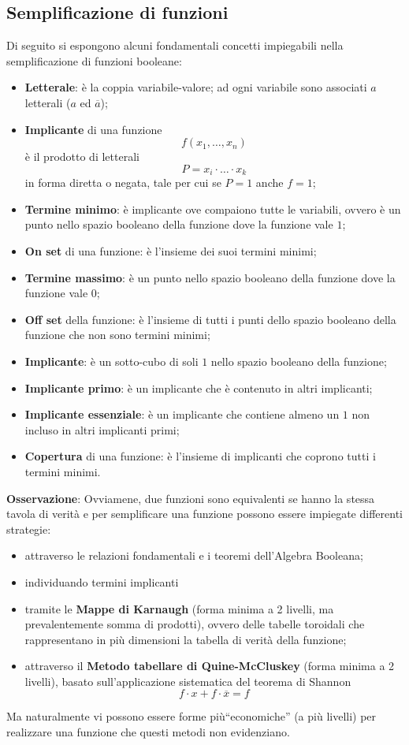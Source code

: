 \documentclass[a4paper]{extarticle}
\newcommand{\quotes}[1]{``#1''}
\begin{document}
\subsection{Semplificazione di funzioni}
Di seguito si espongono alcuni fondamentali concetti impiegabili nella semplificazione di funzioni booleane:
\begin{itemize}
    \item \textbf{Letterale}: è la coppia variabile-valore; ad ogni variabile sono associati $a$ letterali ($a$ ed $\overline{a}$);
    \item \textbf{Implicante} di una funzione 
    \[f(x_1,\dots,x_n)\]
    è il prodotto di letterali 
    \[P=x_i \cdot \dots \cdot x_k\]
    in forma diretta o negata, tale per cui se $P=1$ anche $f=1$;
    \item \textbf{Termine minimo}: è implicante ove compaiono tutte le variabili, ovvero è un punto nello spazio booleano della funzione dove la funzione vale $1$;
    \item \textbf{On set} di una funzione: è l'insieme dei suoi termini minimi;
    \item \textbf{Termine massimo}: è un punto nello spazio booleano della funzione dove la funzione vale $0$;
    \item \textbf{Off set} della funzione: è l'insieme di tutti i punti dello spazio booleano della funzione che non sono termini minimi;
    \item \textbf{Implicante}: è un sotto-cubo di soli $1$ nello spazio booleano della funzione;
    \item \textbf{Implicante primo}: è un implicante che è contenuto in altri implicanti;
    \item \textbf{Implicante essenziale}: è un implicante che contiene almeno un $1$ non incluso in altri implicanti primi;
    \item \textbf{Copertura} di una funzione: è l'insieme di implicanti che coprono tutti i termini minimi.
\end{itemize}

\vspace{1em}
\noindent
\textbf{Osservazione}: Ovviamene, due funzioni sono equivalenti se hanno la stessa tavola di verità e per semplificare una funzione possono essere impiegate differenti strategie:
\begin{itemize}
    \item attraverso le relazioni fondamentali e i teoremi dell'Algebra Booleana;
    \item individuando termini implicanti
    \item tramite le \textbf{Mappe di Karnaugh} (forma minima a 2 livelli, ma prevalentemente somma di prodotti), ovvero delle tabelle toroidali che rappresentano in più dimensioni la tabella di verità della funzione;
    \item attraverso il \textbf{Metodo tabellare di Quine-McCluskey} (forma minima a 2 livelli), basato sull'applicazione sistematica del teorema di Shannon
    \[f \cdot x + f \cdot \overline{x} = f\]
\end{itemize}
Ma naturalmente vi possono essere forme più\quotes{economiche} (a più livelli) per realizzare una funzione che questi metodi non evidenziano.
\end{document}
